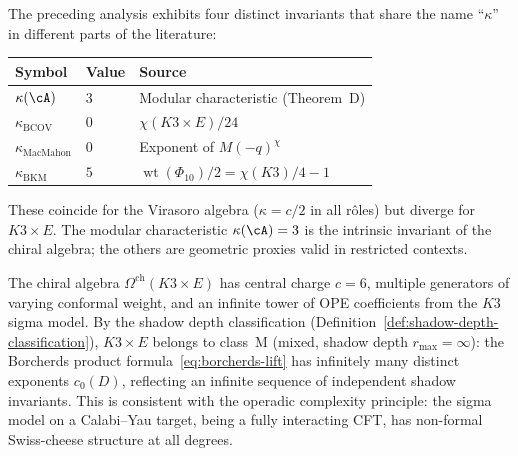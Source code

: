 \begin{remark}
\label{rem:four-kappas}
The preceding analysis exhibits four distinct invariants
that share the name ``$\kappa$'' in different parts of the
literature:
\begin{center}
\small
\renewcommand{\arraystretch}{1.2}
\begin{tabular}{lll}
\textbf{Symbol} & \textbf{Value} & \textbf{Source} \\
\hline
$\kappa(\cA)$ & $3$ & Modular characteristic (Theorem~D) \\
$\kappa_{\mathrm{BCOV}}$ & $0$ & $\chi(K3 \times E)/24$ \\
$\kappa_{\mathrm{MacMahon}}$ & $0$ & Exponent of $M(-q)^{\chi}$ \\
$\kappa_{\mathrm{BKM}}$ & $5$ & $\operatorname{wt}(\Phi_{10})/2 = \chi(K3)/4 - 1$
\end{tabular}
\end{center}
These coincide for the Virasoro algebra
($\kappa = c/2$ in all r\^oles) but diverge for
$K3 \times E$. The modular characteristic $\kappa(\cA) = 3$
is the intrinsic invariant of the chiral algebra; the others
are geometric proxies valid in restricted contexts.
\end{remark}

\begin{remark}
\label{rem:bkm-shadow-depth}
The chiral algebra $\Omega^{\mathrm{ch}}(K3 \times E)$
has central charge $c = 6$, multiple generators of
varying conformal weight, and an infinite tower of OPE
coefficients from the $K3$ sigma model. By the
shadow depth classification
(Definition~\ref{def:shadow-depth-classification}),
$K3 \times E$ belongs to class~M (mixed, shadow depth
$r_{\max} = \infty$): the Borcherds product
formula~\eqref{eq:borcherds-lift} has infinitely many
distinct exponents $c_0(D)$, reflecting an infinite
sequence of independent shadow invariants. This is
consistent with the operadic complexity principle:
the sigma model on a Calabi--Yau target, being a fully
interacting CFT, has non-formal Swiss-cheese structure
at all degrees.
\end{remark}

